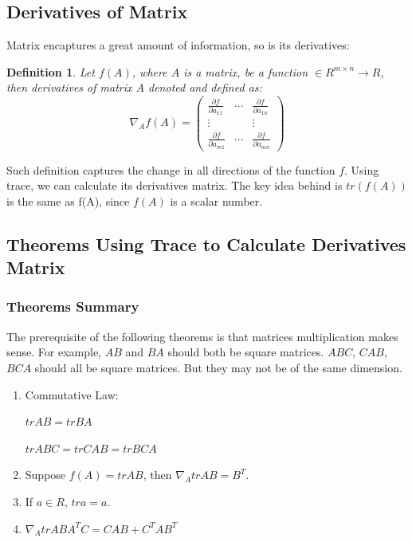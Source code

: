 \documentclass[a4paper]{book}
\newtheorem{definition}{Definition}[section]
\begin{document}
    \subsection{Derivatives of Matrix}

    Matrix encaptures a great amount of information, so is its
    derivatives:

    \begin{definition}
      Let $f(A)$, where $A$ is a matrix, be a function $\in R^{m\times n} \to
      R $, then derivatives of matrix $A$ denoted and defined as:
      \begin{displaymath}
        \nabla_Af(A) =
        \begin{pmatrix}
          \frac{\partial f}{\partial a_{11}} & \cdots & \frac{\partial f}{\partial a_{1n}}\\
          \vdots &  & \vdots\\
          \frac{\partial f}{\partial a_{m1}} & \cdots & \frac{\partial f}{\partial a_{mn}}
        \end{pmatrix}
    \end{displaymath}
    \end{definition}

    Such definition captures the change in all directions of the
    function $f$. Using trace, we can calculate its derivatives matrix.
    The key idea behind is $tr(f(A))$ is the same as f(A), since $f(A)$
    is a scalar number.

    \subsection{Theorems Using Trace to Calculate Derivatives Matrix}

      \subsubsection{Theorems Summary}
      
      The prerequisite of the following theorems is that matrices
      multiplication makes sense. For example, $AB$ and $BA$ should both be
      square matrices. $ABC$, $CAB$, $BCA$ should all be square matrices. But
      they may not be of the same dimension.

      \begin{enumerate}
        \item Commutative Law:

          $trAB = trBA$  

          $trABC = trCAB = trBCA$
        \item Suppose $f(A) = trAB$, then $\nabla_A trAB = B^T$.
        \item If $a \in R$, $tra = a$.
        \item $\nabla_A trABA^TC = CAB + C^TAB^T$
      \end{enumerate}
\end{document}
